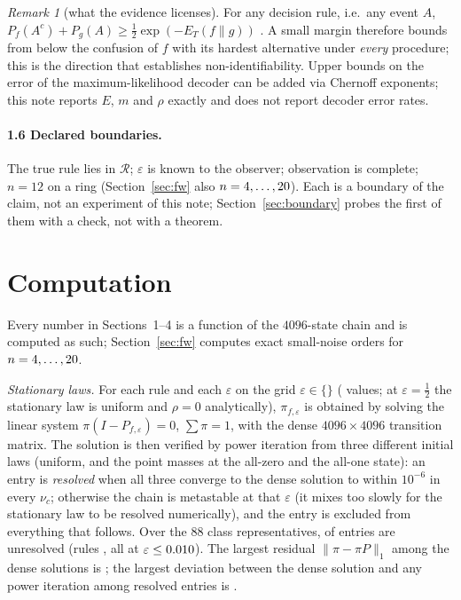 \documentclass[11pt,a4paper]{article}
\theoremstyle{remark}
\newtheorem{remark}{Remark}
\newcommand{\eps}{\varepsilon}
\newcommand{\R}{\mathcal{R}}
\begin{document}
\begin{remark}[what the evidence licenses]\label{rem:bh}
For any decision rule, i.e.\ any event $A$, $P_f(A^c)+P_g(A)\ge\tfrac12\exp(-E_T(f\|g))$ \citep{BretagnolleHuber1979,Tsybakov2009}. A small margin therefore bounds from below the confusion of $f$ with its hardest alternative under \emph{every} procedure; this is the direction that establishes non-identifiability. Upper bounds on the error of the maximum-likelihood decoder can be added via Chernoff exponents; this note reports $E$, $m$ and $\rho$ exactly and does not report decoder error rates.
\end{remark}

\paragraph{1.6 Declared boundaries.}
The true rule lies in $\R$; $\eps$ is known to the observer; observation is complete; $n=12$ on a ring (Section~\ref{sec:fw} also $n=4,\dots,20$). Each is a boundary of the claim, not an experiment of this note; Section~\ref{sec:boundary} probes the first of them with a check, not with a theorem.

\section{Computation}\label{sec:comp}

Every number in Sections~1--4 is a function of the $4096$-state chain and is computed as such; Section~\ref{sec:fw} computes exact small-noise orders for $n=4,\dots,20$.

\emph{Stationary laws.} For each rule and each $\eps$ on the grid $\eps\in\{$\EpsGrid$\}$ (\EpsGridN{} values; at $\eps=\tfrac12$ the stationary law is uniform and $\rho=0$ analytically), $\pi_{f,\eps}$ is obtained by solving the linear system $\pi(I-P_{f,\eps})=0$, $\sum\pi=1$, with the dense $4096\times4096$ transition matrix. The solution is then verified by power iteration from three different initial laws (uniform, and the point masses at the all-zero and the all-one state): an entry is \emph{resolved} when all three converge to the dense solution to within $10^{-6}$ in every $\nu_c$; otherwise the chain is metastable at that $\eps$ (it mixes too slowly for the stationary law to be resolved numerically), and the entry is excluded from everything that follows. Over the $88$ class representatives, \StatUnresolved{} of \StatEntries{} entries are unresolved (rules \StatUnresolvedRules, all at $\eps\le\StatUnresolvedEpsMax$). The largest residual $\|\pi-\pi P\|_1$ among the dense solutions is \StatMaxResidual; the largest deviation between the dense solution and any power iteration among resolved entries is \StatMaxCheckDevResolved.
\end{document}
